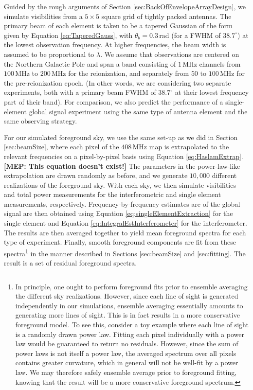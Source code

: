 \documentclass[twocolumn,apj,numberedappendix]{emulateapj}
\newcommand{\mep}[1]{{\color{applegreen} \textbf{[MEP:  #1]}}}
\begin{document}
Guided by the rough arguments of Section \ref{sec:BackOfEnvelopeArrayDesign}, we simulate visibilities from a $5\times5$ square grid of tightly packed antennas. The primary beam of each element is taken to be a tapered Gaussian of the form given by Equation \eqref{eq:TaperedGauss}, with $\theta_b = 0.3\,\textrm{rad}$ (for a FWHM of $38.7^\circ$) at the lowest observation frequency. At higher frequencies, the beam width is assumed to be proportional to $\lambda$. We assume that observations are centered on the Northern Galactic Pole and span a band consisting of $1\,\textrm{MHz}$ channels from $100\,\textrm{MHz}$ to $200\,\textrm{MHz}$ for the reionization, and separately from $50$ to $100\,\textrm{MHz}$ for the pre-reionization epoch. (In other words, we are considering two separate experiments, both with a primary beam FWHM of $38.7^\circ$ at their lowest frequency part of their band). For comparison, we also predict the performance of a single-element global signal experiment using the same type of antenna element and the same observing strategy.

For our simulated foreground sky, we use the same set-up as we did in Section \ref{sec:beamSize}, where each pixel of the $408\,\textrm{MHz}$ map is extrapolated to the relevant frequencies on a pixel-by-pixel basis using Equation \eqref{eq:HaslamExtrap}. \mep{This equation doesn't exist!} The parameters in the power-law-like extrapolation are drawn randomly as before, and we generate $10,000$ different realizations of the foreground sky. With each sky, we then simulate visibilities and total power measurements for the interferometric and single element measurements, respectively. Frequency-by-frequency estimates are of the global signal are then obtained using Equation \eqref{eq:singleElementExtraction} for the single element and Equation \eqref{eq:IntegralEstInterferometer} for the interferometer. The results are then averaged together to yield mean foreground spectra for each type of experiment. Finally, smooth foreground components are fit from these spectra\footnote{In principle, one ought to perform foreground fits prior to ensemble averaging the different sky realizations. However, since each line of sight is generated independently in our simulations, ensemble averaging essentially amounts to generating more lines of sight. This is in fact results in a more conservative foreground model. To see this, consider a toy example where each line of sight is a randomly drawn power law. Fitting each pixel individually with a power law would be guaranteed to return no residuals. However, since the sum of power laws is not itself a power law, the averaged spectrum over all pixels contains greater curvature, which in general will not be well-fit by a power law. We may therefore safely ensemble average prior to foreground fitting, knowing that the result will be a more conservative foreground spectrum.} in the manner described in Sections \ref{sec:beamSize} and \ref{sec:fitting}. The result is a set of residual foreground spectra.
\end{document}
